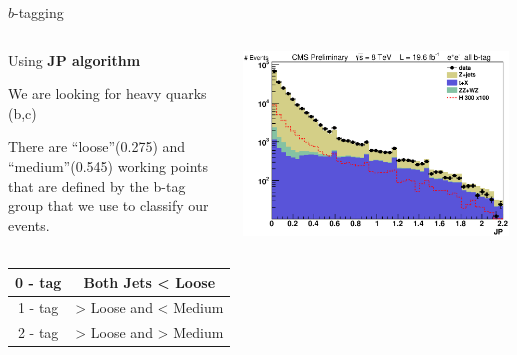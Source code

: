 \begin{frame}{$b$-tagging}
  \begin{columns}
    \begin{column}{0.4\textwidth}
      \begin{itemize}
        {\small
        \item Using {\bf JP algorithm}
          
        \item
          We are looking for heavy quarks (b,c)
        \item
          There are ``loose''(0.275) and ``medium''(0.545) working points that are defined by the b-tag group that we use to classify our events.
        }
      \end{itemize}
      
    \end{column}
    
    \begin{column}{0.6\textwidth}
      \includegraphics[width=0.99\textwidth]{images/preselection/el/j0jp_log.eps}
    \end{column}
  \end{columns}
 \begin{center}
  \begin{tabular}{|c|c|}\hline
    0 - tag  & Both Jets < Loose \\ \hline 
    1 - tag  & > Loose and < Medium \\ \hline
    2 - tag  & > Loose and > Medium \\ \hline
  \end{tabular}
  \end{center}
\end{frame}


